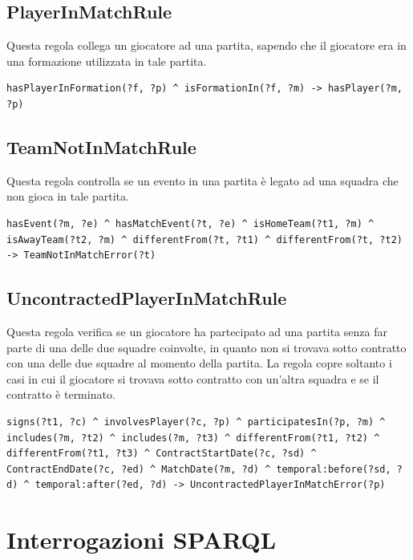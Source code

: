 \documentclass[11pt]{report} %
\begin{document}
\section{PlayerInMatchRule}

Questa regola collega un giocatore ad una partita, sapendo che il giocatore era in una formazione utilizzata in tale partita.

\begin{lstlisting}[language=SWRL]
hasPlayerInFormation(?f, ?p) ^ isFormationIn(?f, ?m) -> hasPlayer(?m, ?p)
\end{lstlisting}

\section{TeamNotInMatchRule}

Questa regola controlla se un evento in una partita è legato ad una squadra che non gioca in tale partita.

\begin{lstlisting}[language=SWRL]
hasEvent(?m, ?e) ^ hasMatchEvent(?t, ?e) ^ isHomeTeam(?t1, ?m) ^ isAwayTeam(?t2, ?m) ^ differentFrom(?t, ?t1) ^ differentFrom(?t, ?t2) -> TeamNotInMatchError(?t)
\end{lstlisting}

\newpage

\section{UncontractedPlayerInMatchRule}

Questa regola verifica se un giocatore ha partecipato ad una partita senza far parte di una delle due squadre coinvolte, in quanto non si trovava sotto contratto con una delle due squadre al momento della partita.
La regola copre soltanto i casi in cui il giocatore si trovava sotto contratto con un'altra squadra e se il contratto è terminato.

\begin{lstlisting}[language=SWRL]
signs(?t1, ?c) ^ involvesPlayer(?c, ?p) ^ participatesIn(?p, ?m) ^ includes(?m, ?t2) ^ includes(?m, ?t3) ^ differentFrom(?t1, ?t2) ^ differentFrom(?t1, ?t3) ^ ContractStartDate(?c, ?sd) ^ ContractEndDate(?c, ?ed) ^ MatchDate(?m, ?d) ^ temporal:before(?sd, ?d) ^ temporal:after(?ed, ?d) -> UncontractedPlayerInMatchError(?p)
\end{lstlisting}

\chapter{Interrogazioni SPARQL}
\end{document}
